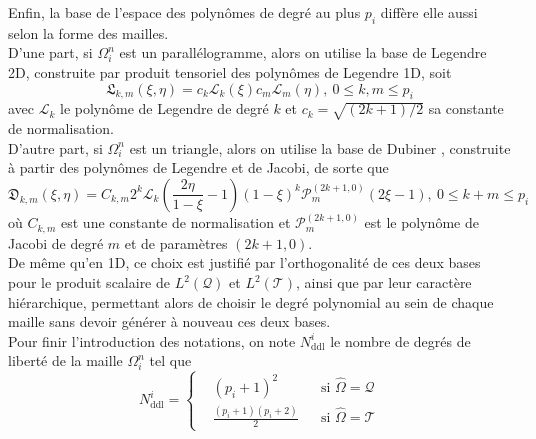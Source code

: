 \documentclass[11pt, a4paper, oneside]{report}
\newcommand{\LegendreL}{\mathfrak{L}}
\newcommand{\DubinerD}{\mathfrak{D}}
\begin{document}
Enfin, la base de l'espace des polynômes de degré au plus $p_i$ diffère elle aussi selon la forme des mailles. \\
D'une part, si $\Omega_i^n$ est un parallélogramme, alors on utilise la base de Legendre 2D, construite par produit tensoriel des polynômes de Legendre 1D, soit
\begin{equation}
    \LegendreL_{k, m}(\xi, \eta) = c_k \mathcal{L}_k(\xi) c_m \mathcal{L}_m(\eta), ~ 0 \leq k, m \leq p_i
\end{equation}
avec $\mathcal{L}_k$ le polynôme de Legendre de degré $k$ et $c_k = \sqrt{(2k+1)/2}$ sa constante de normalisation. \\
D'autre part, si $\Omega_i^n$ est un triangle, alors on utilise la base de Dubiner \cite{dubiner1991spectral}, construite à partir des polynômes de Legendre et de Jacobi, de sorte que
\begin{equation}
    \DubinerD_{k, m}(\xi, \eta) = C_{k, m} 2^k \mathcal{L}_k \left( \frac{2 \eta}{1 - \xi} - 1 \right) (1 - \xi)^k \mathcal{P}_m^{(2k+1, 0)}(2 \xi - 1), ~ 0 \leq k + m \leq p_i
\end{equation}
où $C_{k, m}$ est une constante de normalisation et $\mathcal{P}_m^{(2k+1, 0)}$ est le polynôme de Jacobi de degré $m$ et de paramètres $(2k+1, 0)$. \\
De même qu'en 1D, ce choix est justifié par l'orthogonalité de ces deux bases pour le produit scalaire de $L^2(\mathcal{Q})$ et $L^2(\mathcal{T})$, ainsi que par leur caractère hiérarchique, permettant alors de choisir le degré polynomial au sein de chaque maille sans devoir générer à nouveau ces deux bases. \\
Pour finir l'introduction des notations, on note $N_\text{ddl}^i$ le nombre de degrés de liberté de la maille $\Omega_i^n$ tel que
\begin{equation}
    N_\text{ddl}^i =
    \left \{
    \begin{aligned}
        &(p_i + 1)^2                &&\text{si } \widehat{\Omega} = \mathcal{Q} \\
        &\frac{(p_i+1)(p_i+2)}{2}   &&\text{si } \widehat{\Omega} = \mathcal{T}
    \end{aligned}
    \right .
\end{equation}
\end{document}
